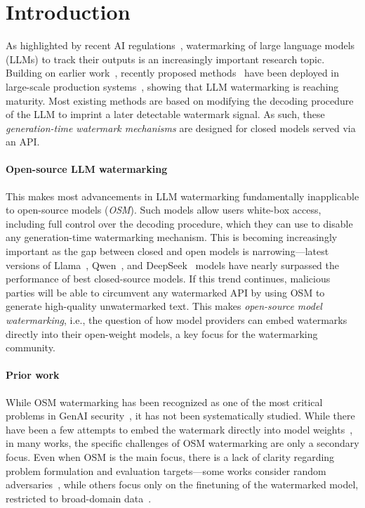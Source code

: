 \section{Introduction}
\label{sec:intro}

As highlighted by recent AI regulations~\citep{aia}, watermarking of large language models (LLMs) to track their outputs is an increasingly important research topic.
Building on earlier work~\citep{aar,kgw,stanford}, recently proposed methods~\citep{synthid-text} have been deployed in large-scale production systems~\citep{synthid}, showing that LLM watermarking is reaching maturity. 
Most existing methods are based on modifying the decoding procedure of the LLM to imprint a later detectable watermark signal. 
As such, these \emph{generation-time watermark mechanisms} are designed for closed models served via an API.  

\paragraph{Open-source LLM watermarking}
This makes most advancements in LLM watermarking fundamentally inapplicable to open-source models (\emph{OSM}). Such models allow users white-box access, including full control over the decoding procedure, which they can use to disable any generation-time watermarking mechanism. 
This is becoming increasingly important as the gap between closed and open models is narrowing---latest versions of Llama~\citep{llama3}, Qwen~\citep{qwen}, and DeepSeek~\citep{deepseek} models have nearly surpassed the performance of best closed-source models.
If this trend continues, malicious parties will be able to circumvent any watermarked API by using OSM to generate high-quality unwatermarked text.
This makes \textit{open-source model watermarking}, i.e., the question of how model providers can embed watermarks directly into their open-weight models, a key focus for the watermarking community.

\paragraph{Prior work}
While OSM watermarking has been recognized as one of the most critical problems in GenAI security~\citep{survey2,genaisurvey,wmsok,whatliesahead}, it has not been systematically studied. 
While there have been a few attempts to embed the watermark directly into model weights~\citep{unremovable, learnability, rlwatermark, gaussmark}, in many works, the specific challenges of OSM watermarking are only a secondary focus.  
Even when OSM is the main focus, there is a lack of clarity regarding problem formulation and evaluation targets---some works consider random adversaries~\citep{unremovable}, while others focus only on the finetuning of the watermarked model, restricted to broad-domain data~\citep{learnability}.

